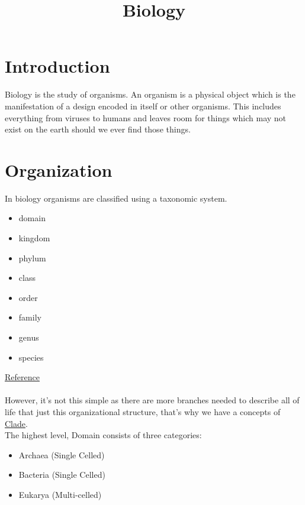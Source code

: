 \documentclass[10pt]{extarticle}
\title{Biology}
\begin{document}
\maketitle
\noindent
\section{Introduction} 
Biology is the study of organisms. 
An organism is a physical object which is the manifestation of a design encoded in itself or other organisms. This includes everything from viruses to  humans and leaves room for things which may not exist on the earth should we ever find those things. 
\section{Organization}
In biology organisms are classified using a taxonomic system. 
\begin{itemize}
\item domain
\item kingdom
\item phylum 
\item class
\item order
\item family
\item genus
\item species
\end{itemize}
\href{https://en.wikipedia.org/wiki/Taxonomy_(biology)#Modern_system_of_classification}{Reference} \\ \\
However, it's not this simple as there are more branches needed to describe all of life that just this organizational structure, that's why we have a concepts of  \href{https://en.wikipedia.org/wiki/Clade}{Clade}.  \\
The highest level, Domain consists of three categories:
\begin{itemize}
	\item Archaea (Single Celled)
	\item Bacteria (Single Celled)
	\item Eukarya (Multi-celled)
\end{itemize}
\end{document}
